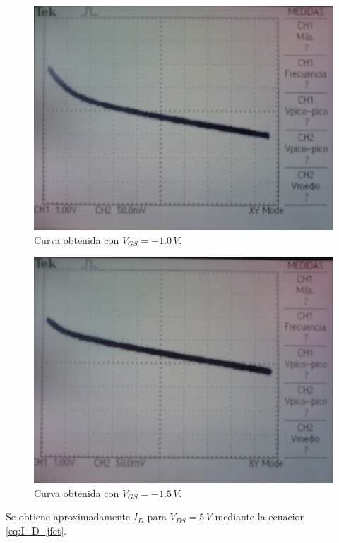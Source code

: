 \documentclass[10pt,spanish,a4paper,notitlepage]{article}
\begin{document}
\begin{figure}[H]
\centering
\includegraphics[scale=0.12]{mediciones/2_vgs-10.jpg}
\caption{Curva obtenida con $V_{GS} = -1.0\,\unit{V}$.}
\label{fig:medicion_jfet_1}
\end{figure}

\begin{figure}[H]
\centering
\includegraphics[scale=0.16]{mediciones/2_vgs-15.jpg}
\caption{Curva obtenida con $V_{GS} = -1.5\,\unit{V}$.}
\label{fig:medicion_jfet_15}
\end{figure}


Se obtiene aproximadamente $I_D$ para $V_{DS} = 5\,\unit{V}$ mediante la ecuacion \ref{eq:I_D_jfet}.
\end{document}
